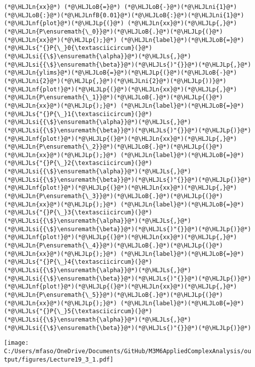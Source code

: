 \documentclass[12pt,landscape]{article}
\newcommand{\HLJLn}[1]{#1}
\newcommand{\HLJLnf}[1]{\textcolor[RGB]{66,102,213}{#1}}
\newcommand{\HLJLs}[1]{\textcolor[RGB]{201,61,57}{#1}}
\newcommand{\HLJLsi}[1]{#1}
\newcommand{\HLJLnfB}[1]{\textcolor[RGB]{59,151,46}{#1}}
\newcommand{\HLJLni}[1]{\textcolor[RGB]{59,151,46}{#1}}
\newcommand{\HLJLoB}[1]{\textcolor[RGB]{102,102,102}{\textbf{#1}}}
\newcommand{\HLJLp}[1]{#1}
\def\cent#1{\begin{center}#1\end{center} }
\begin{document}
{\begin{lstlisting}
(*@\HLJLn{xx}@*) (*@\HLJLoB{=}@*) (*@\HLJLoB{-}@*)(*@\HLJLni{1}@*)(*@\HLJLoB{:}@*)(*@\HLJLnfB{0.01}@*)(*@\HLJLoB{:}@*)(*@\HLJLni{1}@*)
(*@\HLJLnf{plot}@*)(*@\HLJLp{(}@*) (*@\HLJLn{xx}@*)(*@\HLJLp{,}@*) (*@\HLJLn{P\ensuremath{\_0}}@*)(*@\HLJLoB{.}@*)(*@\HLJLp{(}@*)(*@\HLJLn{xx}@*)(*@\HLJLp{);}@*) (*@\HLJLn{label}@*)(*@\HLJLoB{=}@*)(*@\HLJLs{"{}P{\_}0{\textasciicircum}(}@*)(*@\HLJLsi{{\$}\ensuremath{\alpha}}@*)(*@\HLJLs{,}@*)(*@\HLJLsi{{\$}\ensuremath{\beta}}@*)(*@\HLJLs{)"{}}@*)(*@\HLJLp{,}@*) (*@\HLJLn{ylims}@*)(*@\HLJLoB{=}@*)(*@\HLJLp{(}@*)(*@\HLJLoB{-}@*)(*@\HLJLni{2}@*)(*@\HLJLp{,}@*)(*@\HLJLni{2}@*)(*@\HLJLp{))}@*)
(*@\HLJLnf{plot!}@*)(*@\HLJLp{(}@*)(*@\HLJLn{xx}@*)(*@\HLJLp{,}@*) (*@\HLJLn{P\ensuremath{\_1}}@*)(*@\HLJLoB{.}@*)(*@\HLJLp{(}@*)(*@\HLJLn{xx}@*)(*@\HLJLp{);}@*) (*@\HLJLn{label}@*)(*@\HLJLoB{=}@*)(*@\HLJLs{"{}P{\_}1{\textasciicircum}(}@*)(*@\HLJLsi{{\$}\ensuremath{\alpha}}@*)(*@\HLJLs{,}@*)(*@\HLJLsi{{\$}\ensuremath{\beta}}@*)(*@\HLJLs{)"{}}@*)(*@\HLJLp{)}@*)
(*@\HLJLnf{plot!}@*)(*@\HLJLp{(}@*)(*@\HLJLn{xx}@*)(*@\HLJLp{,}@*) (*@\HLJLn{P\ensuremath{\_2}}@*)(*@\HLJLoB{.}@*)(*@\HLJLp{(}@*)(*@\HLJLn{xx}@*)(*@\HLJLp{);}@*) (*@\HLJLn{label}@*)(*@\HLJLoB{=}@*)(*@\HLJLs{"{}P{\_}2{\textasciicircum}(}@*)(*@\HLJLsi{{\$}\ensuremath{\alpha}}@*)(*@\HLJLs{,}@*)(*@\HLJLsi{{\$}\ensuremath{\beta}}@*)(*@\HLJLs{)"{}}@*)(*@\HLJLp{)}@*)
(*@\HLJLnf{plot!}@*)(*@\HLJLp{(}@*)(*@\HLJLn{xx}@*)(*@\HLJLp{,}@*) (*@\HLJLn{P\ensuremath{\_3}}@*)(*@\HLJLoB{.}@*)(*@\HLJLp{(}@*)(*@\HLJLn{xx}@*)(*@\HLJLp{);}@*) (*@\HLJLn{label}@*)(*@\HLJLoB{=}@*)(*@\HLJLs{"{}P{\_}3{\textasciicircum}(}@*)(*@\HLJLsi{{\$}\ensuremath{\alpha}}@*)(*@\HLJLs{,}@*)(*@\HLJLsi{{\$}\ensuremath{\beta}}@*)(*@\HLJLs{)"{}}@*)(*@\HLJLp{)}@*)
(*@\HLJLnf{plot!}@*)(*@\HLJLp{(}@*)(*@\HLJLn{xx}@*)(*@\HLJLp{,}@*) (*@\HLJLn{P\ensuremath{\_4}}@*)(*@\HLJLoB{.}@*)(*@\HLJLp{(}@*)(*@\HLJLn{xx}@*)(*@\HLJLp{);}@*) (*@\HLJLn{label}@*)(*@\HLJLoB{=}@*)(*@\HLJLs{"{}P{\_}4{\textasciicircum}(}@*)(*@\HLJLsi{{\$}\ensuremath{\alpha}}@*)(*@\HLJLs{,}@*)(*@\HLJLsi{{\$}\ensuremath{\beta}}@*)(*@\HLJLs{)"{}}@*)(*@\HLJLp{)}@*)
(*@\HLJLnf{plot!}@*)(*@\HLJLp{(}@*)(*@\HLJLn{xx}@*)(*@\HLJLp{,}@*) (*@\HLJLn{P\ensuremath{\_5}}@*)(*@\HLJLoB{.}@*)(*@\HLJLp{(}@*)(*@\HLJLn{xx}@*)(*@\HLJLp{);}@*) (*@\HLJLn{label}@*)(*@\HLJLoB{=}@*)(*@\HLJLs{"{}P{\_}5{\textasciicircum}(}@*)(*@\HLJLsi{{\$}\ensuremath{\alpha}}@*)(*@\HLJLs{,}@*)(*@\HLJLsi{{\$}\ensuremath{\beta}}@*)(*@\HLJLs{)"{}}@*)(*@\HLJLp{)}@*)
\end{lstlisting}

\cent{\texttt{[image: C:/Users/mfaso/OneDrive/Documents/GitHub/M3M6AppliedComplexAnalysis/output/figures/Lecture19\_3\_1.pdf]}}

}
\end{document}
